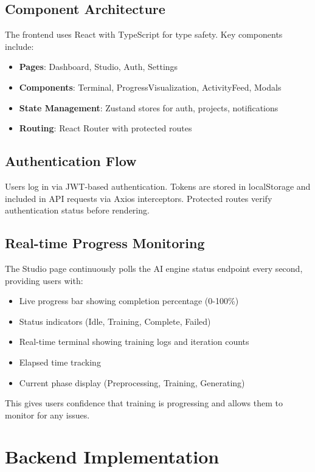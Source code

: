 \documentclass[11pt,a4paper]{article}
\begin{document}
\subsection{Component Architecture}
The frontend uses React with TypeScript for type safety. Key components include:

\begin{itemize}[noitemsep]
    \item \textbf{Pages}: Dashboard, Studio, Auth, Settings
    \item \textbf{Components}: Terminal, ProgressVisualization, ActivityFeed, Modals
    \item \textbf{State Management}: Zustand stores for auth, projects, notifications
    \item \textbf{Routing}: React Router with protected routes
\end{itemize}

\subsection{Authentication Flow}
Users log in via JWT-based authentication. Tokens are stored in localStorage and included in API requests via Axios interceptors. Protected routes verify authentication status before rendering.

\subsection{Real-time Progress Monitoring}
The Studio page continuously polls the AI engine status endpoint every second, providing users with:
\begin{itemize}[noitemsep]
    \item Live progress bar showing completion percentage (0-100\%)
    \item Status indicators (Idle, Training, Complete, Failed)
    \item Real-time terminal showing training logs and iteration counts
    \item Elapsed time tracking
    \item Current phase display (Preprocessing, Training, Generating)
\end{itemize}

This gives users confidence that training is progressing and allows them to monitor for any issues.

\section{Backend Implementation}
\end{document}
